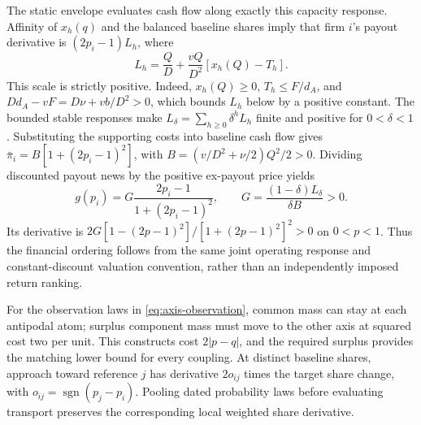The static envelope evaluates cash flow along exactly this capacity response.
Affinity of $x_h(q)$ and the balanced baseline shares imply that firm $i$'s
payout derivative is $(2p_i-1)L_h$, where
\begin{equation}\label{eq:canonical-payout-scale}
  L_h=\frac QD+\frac{vQ}{D^2}[x_h(Q)-T_h].
\end{equation}
This scale is strictly positive.
Indeed, $x_h(Q)\geq0$, $T_h\leq F/d_A$, and
$Dd_A-vF=D\nu+vb/D^2>0$, which bounds $L_h$ below by a positive constant.
The bounded stable responses make $L_\delta=\sum_{h\geq0}\delta^h L_h$ finite
and positive for $0<\delta<1$.
Substituting the supporting costs into baseline cash flow gives
$\bar\pi_i=B[1+(2p_i-1)^2]$, with $B=(v/D^2+\nu/2)Q^2/2>0$.
Dividing discounted payout news by the positive ex-payout price yields
\begin{equation}\label{eq:canonical-return-shape}
  g(p_i)=G\frac{2p_i-1}{1+(2p_i-1)^2},\qquad
  G=\frac{(1-\delta)L_\delta}{\delta B}>0.
\end{equation}
Its derivative is $2G[1-(2p-1)^2]/[1+(2p-1)^2]^2>0$ on $0<p<1$.
Thus the financial ordering follows from the same joint operating response
and constant-discount valuation convention, rather than an independently
imposed return ranking.

For the observation laws in \eqref{eq:axis-observation}, common mass can stay
at each antipodal atom; surplus component mass must move to the other axis at
squared cost two per unit.
This constructs cost $2|p-q|$, and the required surplus provides the matching
lower bound for every coupling.
At distinct baseline shares, approach toward reference $j$ has derivative
$2o_{ij}$ times the target share change, with $o_{ij}=\operatorname{sgn}(p_j-p_i)$.
Pooling dated probability laws before evaluating transport preserves the
corresponding local weighted share derivative.


